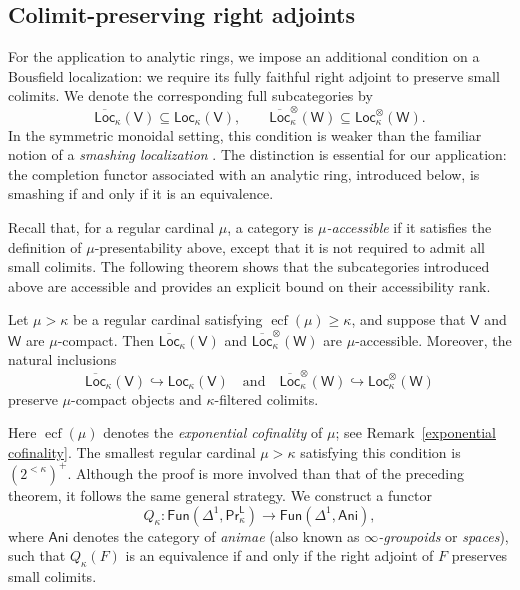 \subsection*{Colimit-preserving right adjoints}

For the application to analytic rings, we impose an additional condition on a Bousfield localization: we require its fully faithful right adjoint to preserve small colimits. We denote the corresponding full subcategories by
\[\overline{\mathsf{Loc}}_\kappa(\mathsf{V})\subseteq\mathsf{Loc}_\kappa(\mathsf{V}),\qquad\overline{\mathsf{Loc}}^\otimes_\kappa(\mathsf{W})\subseteq\mathsf{Loc}^\otimes_\kappa(\mathsf{W}).\]
In the symmetric monoidal setting, this condition is weaker than the familiar notion of a \emph{smashing localization} \cite[Thm.~7.7]{reflectionprinciple}. The distinction is essential for our application: the completion functor associated with an analytic ring, introduced below, is smashing if and only if it is an equivalence. 

Recall that, for a regular cardinal $\mu$, a category is \emph{$\mu$-accessible} if it satisfies the definition of $\mu$-presentability above, except that it is not required to admit all small colimits. The following theorem shows that the subcategories introduced above are accessible and provides an explicit bound on their accessibility rank.

\begin{introthm}[\ref{main categorical theorem}, \ref{main theorem on monoidal localizations}]\label{thm B}
Let $\mu>\kappa$ be a regular cardinal satisfying $\operatorname{ecf}(\mu)\geq\kappa$, and suppose that $\mathsf{V}$ and $\mathsf{W}$ are $\mu$-compact. Then $\overline{\mathsf{Loc}}_\kappa(\mathsf{V})$ and $\overline{\mathsf{Loc}}^\otimes_\kappa(\mathsf{W})$ are $\mu$-accessible. Moreover, the natural inclusions
\[\overline{\mathsf{Loc}}_\kappa(\mathsf{V})\hookrightarrow \mathsf{Loc}_\kappa(\mathsf{V}) \quad\text{and}\quad \overline{\mathsf{Loc}}^\otimes_\kappa(\mathsf{W})\hookrightarrow \mathsf{Loc}^\otimes_\kappa(\mathsf{W})\]
preserve $\mu$-compact objects and $\kappa$-filtered colimits.
\end{introthm}

Here $\operatorname{ecf}(\mu)$ denotes the \emph{exponential cofinality} of $\mu$; see Remark~\ref{exponential cofinality}. The smallest regular cardinal $\mu>\kappa$ satisfying this condition is $(2^{<\kappa})^+$. Although the proof is more involved than that of the preceding theorem, it follows the same general strategy. We construct a functor
\[Q_\kappa\colon\mathsf{Fun}(\Delta^1,\mathsf{Pr}^{\mathsf{L}}_\kappa)\to\mathsf{Fun}(\Delta^1,\mathsf{Ani}),\]
where $\mathsf{Ani}$ denotes the category of \emph{animae} (also known as \emph{$\infty$-groupoids} or \emph{spaces}), such that $Q_\kappa(F)$ is an equivalence if and only if the right adjoint of $F$ preserves small colimits.


